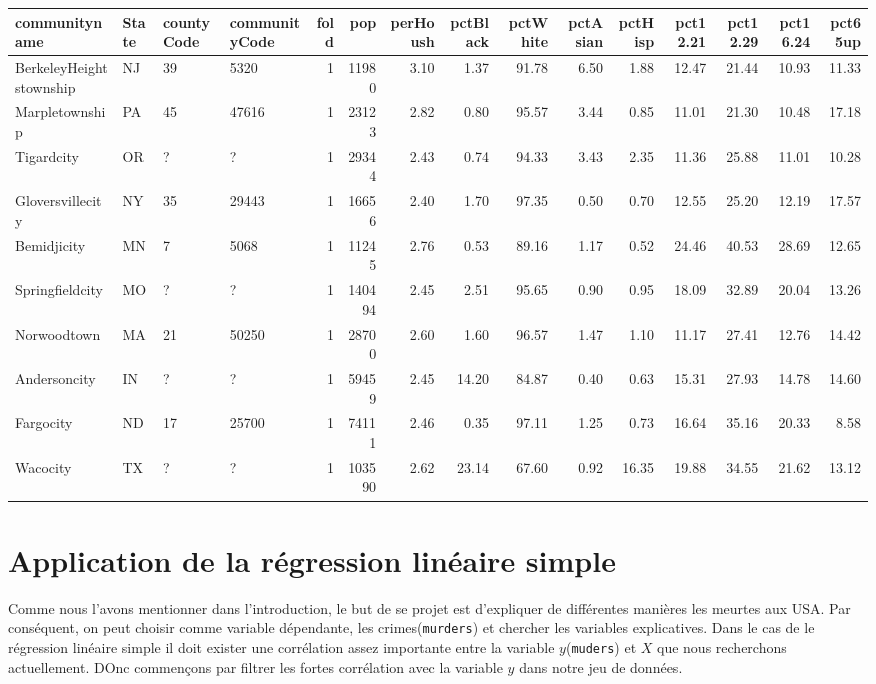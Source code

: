\documentclass[
]{book}
\begin{document}
\begin{tabular}{l|l|l|l|r|r|r|r|r|r|r|r|r|r|r}
\hline
communityname & State & countyCode & communityCode & fold & pop & perHoush & pctBlack & pctWhite & pctAsian & pctHisp & pct12.21 & pct12.29 & pct16.24 & pct65up\\
\hline
BerkeleyHeightstownship & NJ & 39 & 5320 & 1 & 11980 & 3.10 & 1.37 & 91.78 & 6.50 & 1.88 & 12.47 & 21.44 & 10.93 & 11.33\\
\hline
Marpletownship & PA & 45 & 47616 & 1 & 23123 & 2.82 & 0.80 & 95.57 & 3.44 & 0.85 & 11.01 & 21.30 & 10.48 & 17.18\\
\hline
Tigardcity & OR & ? & ? & 1 & 29344 & 2.43 & 0.74 & 94.33 & 3.43 & 2.35 & 11.36 & 25.88 & 11.01 & 10.28\\
\hline
Gloversvillecity & NY & 35 & 29443 & 1 & 16656 & 2.40 & 1.70 & 97.35 & 0.50 & 0.70 & 12.55 & 25.20 & 12.19 & 17.57\\
\hline
Bemidjicity & MN & 7 & 5068 & 1 & 11245 & 2.76 & 0.53 & 89.16 & 1.17 & 0.52 & 24.46 & 40.53 & 28.69 & 12.65\\
\hline
Springfieldcity & MO & ? & ? & 1 & 140494 & 2.45 & 2.51 & 95.65 & 0.90 & 0.95 & 18.09 & 32.89 & 20.04 & 13.26\\
\hline
Norwoodtown & MA & 21 & 50250 & 1 & 28700 & 2.60 & 1.60 & 96.57 & 1.47 & 1.10 & 11.17 & 27.41 & 12.76 & 14.42\\
\hline
Andersoncity & IN & ? & ? & 1 & 59459 & 2.45 & 14.20 & 84.87 & 0.40 & 0.63 & 15.31 & 27.93 & 14.78 & 14.60\\
\hline
Fargocity & ND & 17 & 25700 & 1 & 74111 & 2.46 & 0.35 & 97.11 & 1.25 & 0.73 & 16.64 & 35.16 & 20.33 & 8.58\\
\hline
Wacocity & TX & ? & ? & 1 & 103590 & 2.62 & 23.14 & 67.60 & 0.92 & 16.35 & 19.88 & 34.55 & 21.62 & 13.12\\
\hline
\end{tabular}

\hypertarget{application-de-la-ruxe9gression-linuxe9aire-simple}{%
\section{Application de la régression linéaire simple}\label{application-de-la-ruxe9gression-linuxe9aire-simple}}

Comme nous l'avons mentionner dans l'introduction, le but de se projet est d'expliquer de différentes manières les meurtes aux USA. Par conséquent, on peut choisir comme variable dépendante, les crimes(\texttt{murders}) et chercher les variables explicatives. Dans le cas de le régression linéaire simple il doit exister une corrélation assez importante entre la variable \(y\)(\texttt{muders}) et \(X\) que nous recherchons actuellement. DOnc commençons par filtrer les fortes corrélation avec la variable \(y\) dans notre jeu de données.\\
\end{document}
